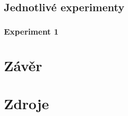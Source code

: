 \documentclass[11pt,a4paper]{article}
\begin{document}
	\subsection{Jednotlivé experimenty}

	\subsubsection{Experiment 1}






	\section{Závěr}

	\newpage
	\section{Zdroje}
		
\end{document}
